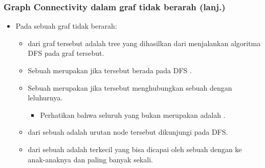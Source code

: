 \begin{frame}
\frametitle{Graph Connectivity dalam graf tidak berarah (lanj.)}
\begin{itemize}
  \item Pada sebuah graf tidak berarah:
  \begin{itemize}
    \item {} dari graf tersebut adalah tree yang dihasilkan dari menjalankan algoritma DFS pada graf tersebut.
    \item Sebuah \fedge merupakan  jika \fedge tersebut berada pada DFS \ftree.
    \item Sebuah \fedge merupakan  jika \fedge tersebut menghubungkan sebuah \fnode dengan leluhurnya.
    \begin{itemize}
      \item Perhatikan bahwa seluruh \fedge yang bukan merupakan \ftreeedge adalah \fbackedge.
    \end{itemize}
    \item {} dari sebuah \fnode adalah urutan node tersebut dikunjungi pada DFS.
    \item {} dari sebuah \fnode adalah \fdiscoverytime terkecil yang bisa dicapai oleh sebuah \fnode dengan \ftreeedge ke anak-anaknya dan \fbackedge paling banyak sekali.
  \end{itemize}
\end{itemize}
\end{frame}

